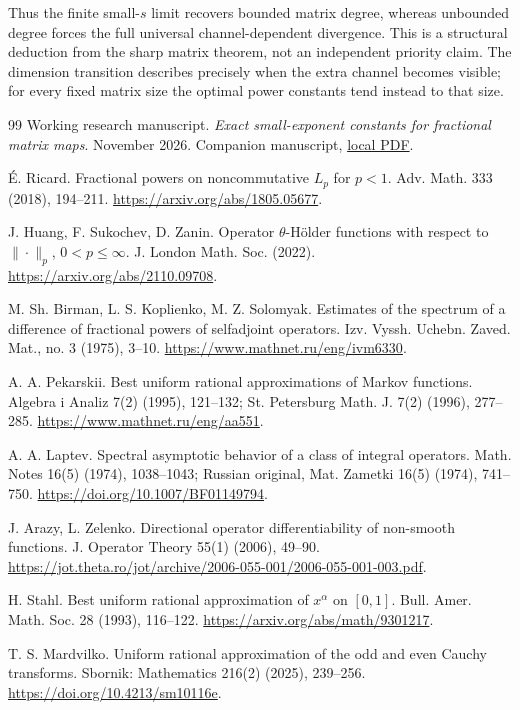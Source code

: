 \documentclass[11pt]{article}
\numberwithin{equation}{section}
\begin{document}
Thus the finite small-$s$ limit recovers bounded matrix degree, whereas
unbounded degree forces the full universal channel-dependent divergence.
This is a structural deduction from the sharp matrix theorem, not an
independent priority claim. The dimension transition describes precisely
when the extra channel becomes visible; for every fixed matrix size
the optimal power constants tend instead to that size.

\begin{thebibliography}{99}
Working research manuscript.
\emph{Exact small-exponent constants for fractional matrix maps}.
November 2026. Companion manuscript,
\href{sharp-fractional-holder.pdf}{local PDF}.

\'E. Ricard. Fractional powers on noncommutative $L_p$ for $p<1$.
Adv. Math. 333 (2018), 194--211.
\url{https://arxiv.org/abs/1805.05677}.

J. Huang, F. Sukochev, D. Zanin.
Operator $\theta$-H\"older functions with respect to $\|\cdot\|_p$,
$0<p\le\infty$. J. London Math. Soc. (2022).
\url{https://arxiv.org/abs/2110.09708}.

M. Sh. Birman, L. S. Koplienko, M. Z. Solomyak.
Estimates of the spectrum of a difference of fractional powers of
selfadjoint operators. Izv. Vyssh. Uchebn. Zaved. Mat., no. 3 (1975), 3--10.
\url{https://www.mathnet.ru/eng/ivm6330}.

A. A. Pekarskii. Best uniform rational approximations of Markov functions.
Algebra i Analiz 7(2) (1995), 121--132; St. Petersburg Math. J.
7(2) (1996), 277--285. \url{https://www.mathnet.ru/eng/aa551}.

A. A. Laptev. Spectral asymptotic behavior of a class of integral operators.
Math. Notes 16(5) (1974), 1038--1043; Russian original,
Mat. Zametki 16(5) (1974), 741--750.
\url{https://doi.org/10.1007/BF01149794}.

J. Arazy, L. Zelenko. Directional operator differentiability of non-smooth
functions. J. Operator Theory 55(1) (2006), 49--90.
\url{https://jot.theta.ro/jot/archive/2006-055-001/2006-055-001-003.pdf}.

H. Stahl. Best uniform rational approximation of $x^\alpha$ on $[0,1]$.
Bull. Amer. Math. Soc. 28 (1993), 116--122.
\url{https://arxiv.org/abs/math/9301217}.

T. S. Mardvilko. Uniform rational approximation of the odd and even
Cauchy transforms. Sbornik: Mathematics 216(2) (2025), 239--256.
\url{https://doi.org/10.4213/sm10116e}.


\end{thebibliography}
\end{document}
